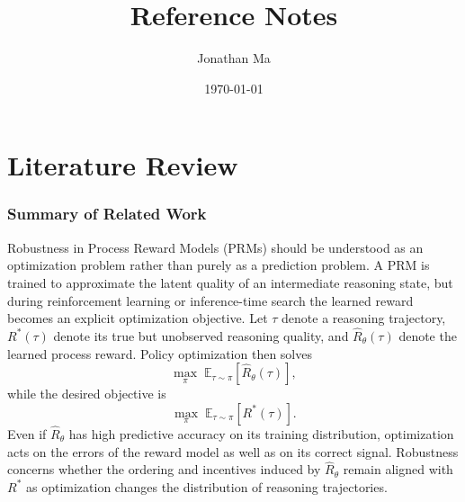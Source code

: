 \documentclass[11pt]{article}
\title{\textbf{Reference Notes}}
\author{Jonathan Ma}
\date{\today}
\begin{document}
\maketitle
\tableofcontents
\newpage

\part{Literature Review}

\section{Summary of Related Work}

Robustness in Process Reward Models (PRMs) should be understood as an optimization problem rather than purely as a prediction problem. A PRM is trained to approximate the latent quality of an intermediate reasoning state, but during reinforcement learning or inference-time search the learned reward becomes an explicit optimization objective. Let $\tau$ denote a reasoning trajectory, $R^{*}(\tau)$ denote its true but unobserved reasoning quality, and $\widehat{R}_{\theta}(\tau)$ denote the learned process reward. Policy optimization then solves
\[
\max_{\pi}
\;
\mathbb{E}_{\tau\sim\pi}
\left[
\widehat{R}_{\theta}(\tau)
\right],
\]
while the desired objective is
\[
\max_{\pi}
\;
\mathbb{E}_{\tau\sim\pi}
\left[
R^{*}(\tau)
\right].
\]
Even if $\widehat{R}_{\theta}$ has high predictive accuracy on its training distribution, optimization acts on the errors of the reward model as well as on its correct signal. Robustness concerns whether the ordering and incentives induced by $\widehat{R}_{\theta}$ remain aligned with $R^{*}$ as optimization changes the distribution of reasoning trajectories.
\end{document}
